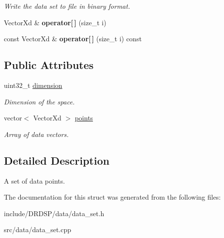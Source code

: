\begin{DoxyCompactItemize}
\begin{DoxyCompactList}\small\item\em Write the data set to file in binary format. \end{DoxyCompactList}\item 
\hypertarget{struct_d_r_d_s_p_1_1_data_set_a6124959ad62a522b65cf6ad715166354}{Vector\-Xd \& {\bfseries operator\mbox{[}$\,$\mbox{]}} (size\-\_\-t i)}\label{struct_d_r_d_s_p_1_1_data_set_a6124959ad62a522b65cf6ad715166354}

\item 
\hypertarget{struct_d_r_d_s_p_1_1_data_set_aea3071fb03508e07e4d39056247eaaf9}{const Vector\-Xd \& {\bfseries operator\mbox{[}$\,$\mbox{]}} (size\-\_\-t i) const }\label{struct_d_r_d_s_p_1_1_data_set_aea3071fb03508e07e4d39056247eaaf9}

\end{DoxyCompactItemize}
\subsection*{Public Attributes}
\begin{DoxyCompactItemize}
\item 
\hypertarget{struct_d_r_d_s_p_1_1_data_set_aa2598262725329c137e03b8947638780}{uint32\-\_\-t \hyperlink{struct_d_r_d_s_p_1_1_data_set_aa2598262725329c137e03b8947638780}{dimension}}\label{struct_d_r_d_s_p_1_1_data_set_aa2598262725329c137e03b8947638780}

\begin{DoxyCompactList}\small\item\em Dimension of the space. \end{DoxyCompactList}\item 
\hypertarget{struct_d_r_d_s_p_1_1_data_set_ac486c907dea215957d503dc4dc9d76e3}{vector$<$ Vector\-Xd $>$ \hyperlink{struct_d_r_d_s_p_1_1_data_set_ac486c907dea215957d503dc4dc9d76e3}{points}}\label{struct_d_r_d_s_p_1_1_data_set_ac486c907dea215957d503dc4dc9d76e3}

\begin{DoxyCompactList}\small\item\em Array of data vectors. \end{DoxyCompactList}\end{DoxyCompactItemize}


\subsection{Detailed Description}
A set of data points. 

The documentation for this struct was generated from the following files\-:\begin{DoxyCompactItemize}
\item 
include/\-D\-R\-D\-S\-P/data/data\-\_\-set.\-h\item 
src/data/data\-\_\-set.\-cpp\end{DoxyCompactItemize}
